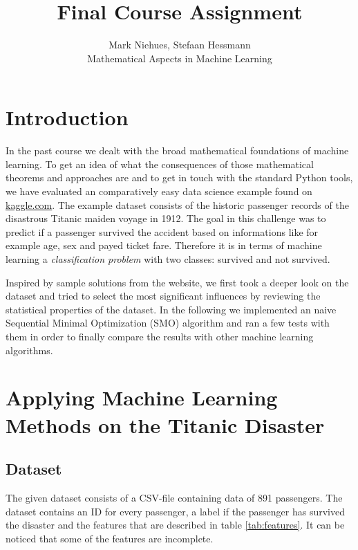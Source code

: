 
\renewcommand{\arraystretch}{1.2} %
\usepackage{array} %


 
\title{Final Course Assignment \\ }%
\author{Mark Niehues, Stefaan Hessmann \\ %
Mathematical Aspects in Machine Learning} %

\maketitle
 
\section{Introduction}
In the past course we dealt with the broad mathematical foundations of machine learning. To get an idea of what the consequences of those mathematical theorems and approaches are and to get in touch with the standard Python tools, we have evaluated an comparatively easy data science example found on \url{kaggle.com}. The example dataset \cite{Kaggle2017} consists of the historic passenger records of the disastrous Titanic maiden voyage in 1912. The goal in this challenge was to predict if a passenger survived the accident based on informations like for example age, sex and payed ticket fare. Therefore it is in terms of machine learning a \textit{classification problem} with two classes: survived and not survived.

Inspired by sample solutions from the website, we first took a deeper look on the dataset and tried to select the most significant influences by reviewing the statistical properties of the dataset. In the following we implemented an naive Sequential Minimal Optimization (SMO) algorithm and ran a few tests with them in order to finally compare the results with other machine learning algorithms.

\section{Applying Machine Learning Methods on the Titanic Disaster}
\subsection{Dataset}
The given dataset consists of a CSV-file containing data of 891 passengers. The dataset contains an ID for every passenger, a label if the passenger has survived the disaster and the features that are described in table \ref{tab:features}. It can be noticed that some of the features are incomplete.

